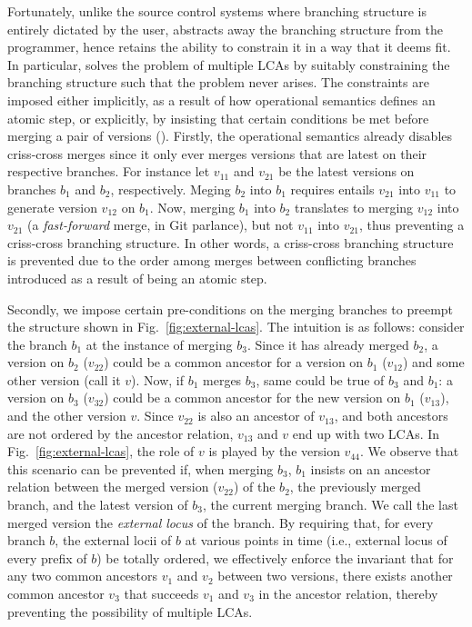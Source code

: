 Fortunately, unlike the source control systems where branching
structure is entirely dictated by the user, \name abstracts away the
branching structure from the programmer, hence retains the ability to
constrain it in a way that it deems fit. In particular, \name solves
the problem of multiple LCAs by suitably constraining the branching
structure such that the problem never arises. The constraints are
imposed either implicitly, as a result of how operational semantics
defines an atomic step, or explicitly, by insisting that certain
conditions be met before merging a pair of versions
(). Firstly, the operational semantics already
disables criss-cross merges since it only ever merges versions that
are latest on their respective branches. For instance let $v_{11}$ and
$v_{21}$ be the latest versions on branches $b_1$ and $b_2$,
respectively. Meging $b_2$ into $b_1$ requires entails $v_{21}$ into
$v_{11}$ to generate version $v_{12}$ on $b_1$. Now, merging $b_1$
into $b_2$ translates to merging $v_{12}$ into $v_{21}$ (a
\emph{fast-forward} merge, in Git parlance), but not $v_{11}$ into
$v_{21}$, thus preventing a criss-cross branching structure. In other
words, a criss-cross branching structure is prevented due to the
order among merges between conflicting branches introduced as a result
of  being an atomic step. 

Secondly, we impose certain pre-conditions on the merging branches to
preempt the structure shown in Fig.~\ref{fig:external-lcas}. The
intuition is as follows: consider the branch $b_1$ at the instance of
merging $b_3$. Since it has already merged $b_2$, a version on $b_2$
($v_{22}$) could be a common ancestor for a version on $b_1$
($v_{12}$) and some other version (call it $v$). Now, if $b_1$ merges
$b_3$, same could be true of $b_3$ and $b_1$: a version on $b_3$
($v_{32}$) could be a common ancestor for the new version on $b_1$
($v_{13}$), and the other version $v$. Since $v_{22}$ is also an
ancestor of $v_{13}$, and both ancestors are not ordered by the
ancestor relation, $v_{13}$ and $v$ end up with two LCAs. In
Fig.~\ref{fig:external-lcas}, the role of $v$ is played by the version
$v_{44}$. We observe that this scenario can be prevented if, when
merging $b_3$, $b_1$ insists on an ancestor relation between the
merged version ($v_{22}$) of the $b_2$, the previously merged branch,
and the latest version of $b_3$, the current merging branch. We call
the last merged version the \emph{external locus} of the branch. By
requiring that, for every branch $b$, the external locii of $b$ at
various points in time (i.e., external locus of every prefix of $b$)
be totally ordered, we effectively enforce the invariant that for any
two common ancestors $v_1$ and $v_2$ between two versions, there
exists another common ancestor $v_3$ that succeeds $v_1$ and $v_3$ in
the ancestor relation, thereby preventing the possibility of multiple
LCAs.

